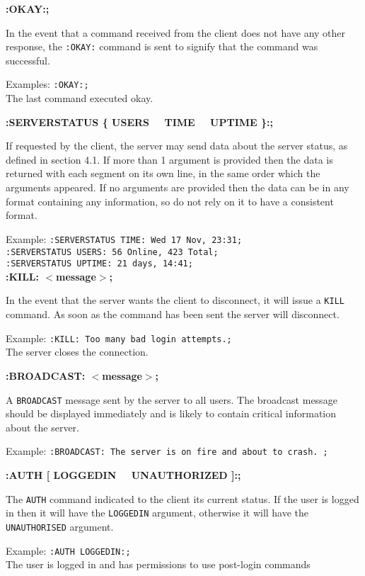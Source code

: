 {\bf :OKAY:;}

In the event that a command received from the client does not have any other response, the \texttt{:OKAY:} command is sent to signify that the command was successful. 

Examples:
\texttt{:OKAY:;}\\
The last command executed okay.

{\bf :SERVERSTATUS \{ USERS \ \vline \ TIME \ \vline \ UPTIME \}:;}

If requested by the client, the server may send data about the server status, as defined in section 4.1. If more than 1 argument is provided then the data is returned with each segment on its own line, in the same order which the arguments appeared. If no arguments are provided then the data can be in any format containing any information, so do not rely on it to have a consistent format.

Example:
\texttt{:SERVERSTATUS TIME: Wed 17 Nov, 23:31;} \\
\texttt{:SERVERSTATUS USERS: 56 Online, 423 Total;} \\
\texttt{:SERVERSTATUS UPTIME: 21 days, 14:41;} \\

{\bf :KILL: $<$message$>$;}

In the event that the server wants the client to disconnect, it will issue a \texttt{KILL} command. As soon as the command has been sent the server will disconnect. 

Example:
\texttt{:KILL: Too many bad login attempts.;}\\
The server closes the connection.

{\bf :BROADCAST: $<$message$>$;}

A \texttt{BROADCAST} message sent by the server to all users. The broadcast message should be displayed immediately and is likely to contain critical information about the server.

Example:
\texttt{:BROADCAST: The server is on fire and about to crash. ;}

{\bf :AUTH [ LOGGEDIN \ \vline \ UNAUTHORIZED ]:;}

The \texttt{AUTH} command indicated to the client its current status. If the user is logged in then it will have the \texttt{LOGGEDIN} argument, otherwise it will have the \texttt{UNAUTHORISED} argument.

Example:
\texttt{:AUTH LOGGEDIN:;}\\
The user is logged in and has permissions to use post-login commands

